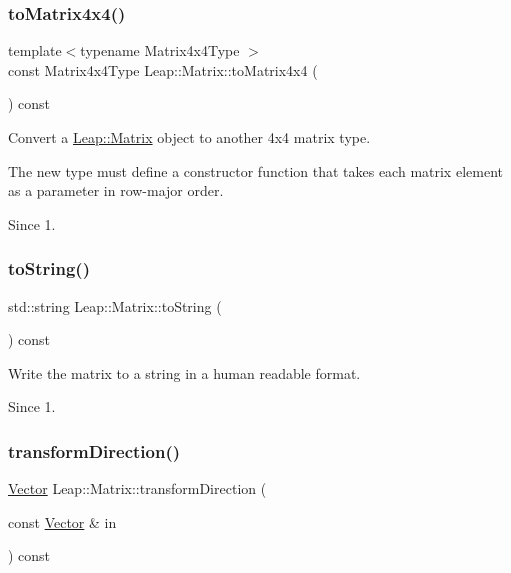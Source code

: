 \subsubsection{\texorpdfstring{to\+Matrix4x4()}{toMatrix4x4()}}
{\footnotesize\ttfamily template$<$typename Matrix4x4\+Type $>$ \\
const Matrix4x4\+Type Leap\+::\+Matrix\+::to\+Matrix4x4 (\begin{DoxyParamCaption}{ }\end{DoxyParamCaption}) const\hspace{0.3cm}{\ttfamily [inline]}}

Convert a \hyperlink{struct_leap_1_1_matrix}{Leap\+::\+Matrix} object to another 4x4 matrix type.

The new type must define a constructor function that takes each matrix element as a parameter in row-\/major order. \begin{DoxySince}{Since}
1. 
\end{DoxySince}
\mbox{\label{struct_leap_1_1_matrix_a5ed060fc00784808820940511c342df1}} 
\subsubsection{\texorpdfstring{to\+String()}{toString()}}
{\footnotesize\ttfamily std\+::string Leap\+::\+Matrix\+::to\+String (\begin{DoxyParamCaption}{ }\end{DoxyParamCaption}) const\hspace{0.3cm}{\ttfamily [inline]}}

Write the matrix to a string in a human readable format. \begin{DoxySince}{Since}
1. 
\end{DoxySince}
\mbox{\label{struct_leap_1_1_matrix_a6c7151d9d80487f7a16587e9e4896796}} 
\subsubsection{\texorpdfstring{transform\+Direction()}{transformDirection()}}
{\footnotesize\ttfamily \hyperlink{struct_leap_1_1_vector}{Vector} Leap\+::\+Matrix\+::transform\+Direction (\begin{DoxyParamCaption}\item[{const \hyperlink{struct_leap_1_1_vector}{Vector} \&}]{in }\end{DoxyParamCaption}) const\hspace{0.3cm}{\ttfamily [inline]}}

